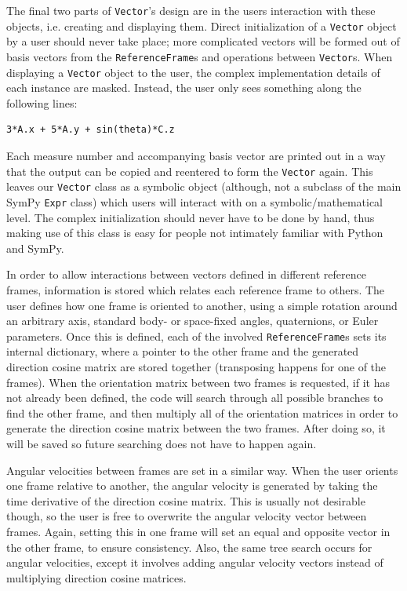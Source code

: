 \documentclass[twocolumn,10pt,final]{asme2e}
\begin{document}
The final two parts of \verb|Vector|'s design are in the users interaction with
these objects, i.e. creating and displaying them. Direct initialization of a
\verb|Vector| object by a user should never take place; more complicated
vectors will be formed out of basis vectors from the \verb|ReferenceFrame|s and
operations between \verb|Vector|s. When displaying a \verb|Vector| object to
the user, the complex implementation details of each instance are masked.
Instead, the user only sees something along the following lines:
\begin{verbatim}
3*A.x + 5*A.y + sin(theta)*C.z
\end{verbatim}
Each measure number and accompanying basis vector are printed out in a way that
the output can be copied and reentered to form the \verb|Vector| again.  This
leaves our \verb|Vector| class as a symbolic object (although, not a subclass
of the main SymPy \verb|Expr| class) which users will interact with on a
symbolic/mathematical level. The complex initialization should never have to be
done by hand, thus making use of this class is easy for people not intimately
familiar with Python and SymPy.

In order to allow interactions between vectors defined in different reference
frames, information is stored which relates each reference frame to others.
The user defines how one frame is oriented to another, using a simple rotation
around an arbitrary axis, standard body- or space-fixed angles, quaternions, or
Euler parameters. Once this is defined, each of the involved
\verb|ReferenceFrame|s sets its internal dictionary, where a pointer to the
other frame and the generated direction cosine matrix are stored together
(transposing happens for one of the frames). When the orientation matrix
between two frames is requested, if it has not already been defined, the code
will search through all possible branches to find the other frame, and then
multiply all of the orientation matrices in order to generate the direction
cosine matrix between the two frames. After doing so, it will be saved so
future searching does not have to happen again.

Angular velocities between frames are set in a similar way.
When the user orients one frame relative to another, the angular velocity is
generated by taking the time derivative of the direction cosine matrix.
This is usually not desirable though, so the user is free to overwrite the
angular velocity vector between frames.
Again, setting this in one frame will set an equal and opposite vector in the
other frame, to ensure consistency.
Also, the same tree search occurs for angular velocities, except it involves
adding angular velocity vectors instead of multiplying direction cosine matrices.
\end{document}
